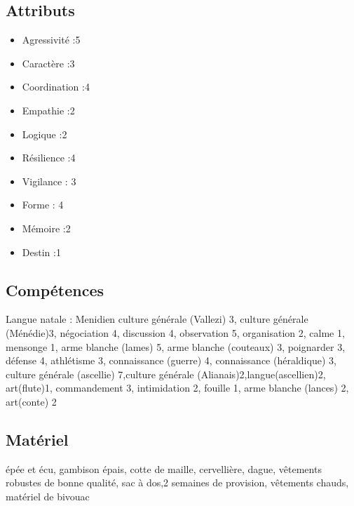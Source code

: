 \documentclass[10pt,a4paper]{article}
\begin{document}
\subsection{Attributs}
\begin{itemize}
\item Agressivité :5
\item Caractère :3
\item Coordination :4
\item Empathie :2
\item Logique :2
\item Résilience :4
\item Vigilance : 3
\item Forme : 4
\item Mémoire :2
\item Destin :1
\end{itemize}
\subsection{Compétences}
Langue natale : Menidien
culture générale (Vallezi) 3, culture générale (Ménédie)3, négociation 4, discussion 4, observation 5, organisation 2, calme 1, mensonge 1, arme blanche (lames) 5, arme blanche (couteaux) 3, poignarder 3, défense 4, athlétisme 3, connaissance (guerre) 4, connaissance (héraldique) 3, culture générale (ascellie) 7,culture générale (Alianais)2,langue(ascellien)2, art(flute)1, commandement 3, intimidation 2, fouille 1, arme blanche (lances) 2, art(conte) 2
\subsection{Matériel}
épée et écu, gambison épais, cotte de maille, cervellière, dague, vêtements robustes de bonne qualité, sac à dos,2 semaines de provision, vêtements chauds, matériel de bivouac
\end{document}
